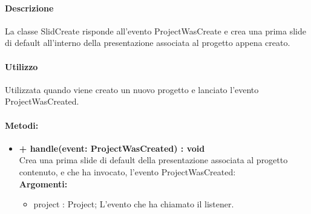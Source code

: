 \paragraph{Descrizione}
La classe SlidCreate risponde all'evento ProjectWasCreate e crea una prima \gls{slide} di default all'interno della presentazione associata al progetto appena creato.

\paragraph{Utilizzo}
Utilizzata quando viene creato un nuovo progetto e lanciato l'evento ProjectWasCreated.

\paragraph{Metodi:}
\begin{itemize}
	\item \textbf{+ handle(event: ProjectWasCreated) : void}\\
	Crea una prima \gls{slide} di default della presentazione associata al progetto contenuto, e che ha invocato, l'evento ProjectWasCreated:\\
	\textbf{Argomenti:}
	\begin{itemize}
		\item project : Project;
		L'evento che ha chiamato il listener.
	\end{itemize}
\end{itemize}
